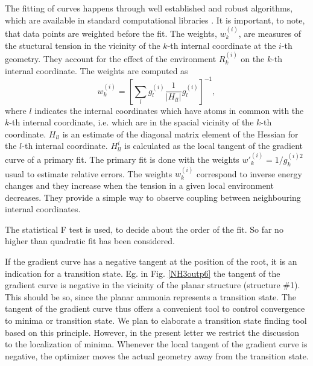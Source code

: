 \documentclass[prl,aps,twocolumn,showpacs,twocolumngrid,superbib]{revtex4}
\begin{document}
The fitting of curves happens through 
well established and robust algorithms, which are available in standard 
computational libraries 
\cite{slatec}. 
It is important, to note,
that data points are weighted before the fit. The weights, 
$w_{k}^{(i)}$, are
measures of the stuctural tension in the vicinity of the $k$-th internal
coordinate at the $i$-th geometry. They account for the effect of the 
environment $R_{k}^{(i)}$ on the $k$-th internal coordinate. 
The weights are computed as
\begin{equation}
w_{k}^{(i)} = \left[ \sum_{l} g_{l}^{(i)} \frac{1}{|H_{ll}^{}|} g_{l}^{(i)} \right]^{-1} ,
\end{equation}
where $l$ indicates the internal coordinates which have atoms in common
with the $k$-th internal coordinate, i.e. which are in the spacial 
vicinity of the $k$-th coordinate. $H_{ll}^{}$ is an estimate
of the diagonal matrix element of the Hessian for the $l$-th 
internal coordinate. $H_{ll}^{i}$ is calculated as the local tangent
of the gradient curve of a primary fit. 
The primary fit is done with 
the weights $w{'}_{k}^{(i)} = 1/g_{k}^{(i)2}$ usual to 
estimate relative errors.
The weights $w_{k}^{(i)}$ correspond to inverse energy changes
and they increase when the tension in a given 
local environment decreases. They provide
a simple way to observe coupling between neighbouring internal
coordinates.

The statistical F test is used, to decide about the order of the fit. 
So far no higher than quadratic fit has been considered.

If the gradient curve has a negative tangent at the position
of the root, it is an indication for a transition state. 
Eg. in Fig. \ref{NH3outp6}
the tangent of the gradient curve is negative 
in the vicinity of the planar
structure (structure \#1). This should be so, since the planar
ammonia represents a transition state. The tangent of the gradient 
curve thus offers a
convenient tool to control convergence to minima or transition state.
We plan to elaborate a transition state finding tool based on this 
principle. However, in the present letter we restrict the discussion
to the localization of minima. Whenever the local tangent  
of the gradient curve
is negative, the optimizer moves the actual geometry away from 
the transition state.
\end{document}

